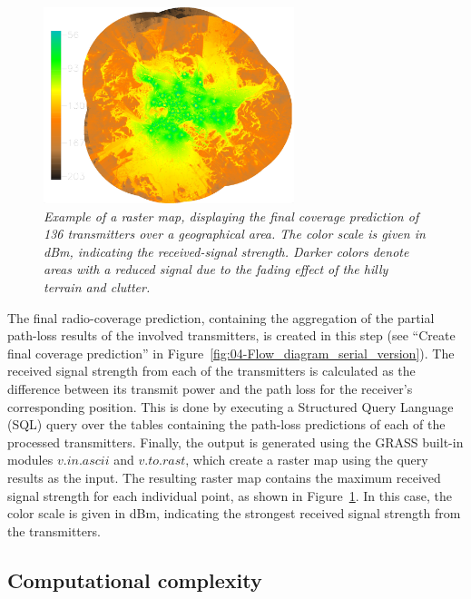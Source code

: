 \begin{figure}
\centering

\includegraphics[width=0.65\textwidth]{04-framework_design_and_implementation/img/final_coverage}

\caption{\textit{\emph{Example of a raster map, displaying the final coverage
prediction of 136 transmitters over a geographical area. The color
scale is given in dBm, indicating the received-signal strength. Darker
colors denote areas with a reduced signal due to the fading effect
of the hilly terrain and clutter. \label{fig:04-Raster_prediction_example}}}}
\end{figure}


The final radio-coverage prediction, containing the aggregation of
the partial path-loss results of the involved transmitters, is created
in this step (see ``Create final coverage prediction'' in Figure~\ref{fig:04-Flow_diagram_serial_version}).
The received signal strength from each of the transmitters is calculated
as the difference between its transmit power and the path loss for
the receiver's corresponding position. This is done by executing a
Structured Query Language (SQL)
query over the tables containing the path-loss predictions of each
of the processed transmitters. Finally, the output is generated using
the GRASS built-in modules $v.in.ascii$ and $v.to.rast$, which create
a raster map using the query results as the input. The resulting raster
map contains the maximum received signal strength for each individual
point, as shown in Figure~\ref{fig:04-Raster_prediction_example}.
In this case, the color scale is given in dBm, indicating the strongest
received signal strength from the transmitters.


\subsection{Computational complexity \label{sub:04-Computational_complexity}}

